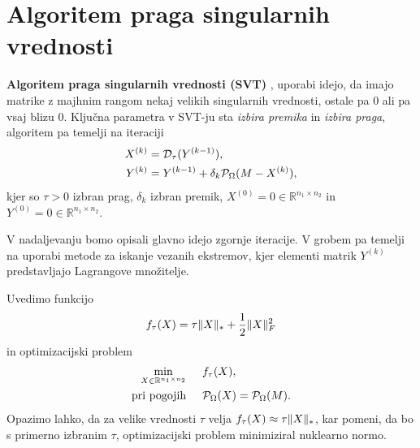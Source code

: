 \section{Algoritem praga singularnih vrednosti}\label{2807-1441}
\textbf{Algoritem praga singularnih vrednosti (SVT)} \cite{CCS}, uporabi idejo, da imajo matrike z majhnim rangom nekaj velikih singularnih vrednosti, ostale pa 0 ali pa vsaj blizu 0. Ključna parametra v SVT-ju sta \textit{izbira premika} in \textit{izbira praga},  
algoritem pa temelji na iteraciji
\begin{align}
\label{2407-1910}
        X^{(k)} &= \mathcal{D}_\tau(Y^{(k-1)}), \\
        Y^{(k)} &= Y^{(k-1)} + \delta_k \mathcal{P}_\Omega(M - X^{(k)}), 
\end{align}
kjer so $\tau > 0$ izbran prag, $\delta_k$ izbran premik, $X^{(0)} = 0 \in \mathbb{R}^{n_1 \times n_2}$ in
$Y^{(0)} = 0 \in \mathbb{R}^{n_1 \times n_2}$. \cite{CCS}

V nadaljevanju bomo opisali glavno idejo zgornje iteracije. V grobem pa temelji na uporabi metode za iskanje vezanih ekstremov, kjer elementi matrik $Y^{(k)}$ predstavljajo Lagrangove množitelje. 

Uvedimo funkcijo 
\begin{align}
    \label{1007-2007}
    f_\tau(X) = \tau\lVert X\rVert_* + \frac{1}{2}\lVert X\rVert_F^2
\end{align}
in optimizacijski problem
\begin{align}
\label{2706-0957}
\begin{split}
    \min_{X\in \mathbb R^{n_1\times n_2}} & \hspace{0.5cm} f_\tau(X), \\
    \textrm{pri pogojih} & \hspace{0.5cm} \mathcal{P}_\Omega(X) = \mathcal{P}_\Omega(M).
\end{split}
\end{align}
Opazimo lahko, da za velike vrednosti $\tau$ velja $f_\tau(X) \approx \tau\lVert X\rVert_*$, kar pomeni, da bo s primerno izbranim $\tau$, optimizacijski problem minimiziral nuklearno normo.


